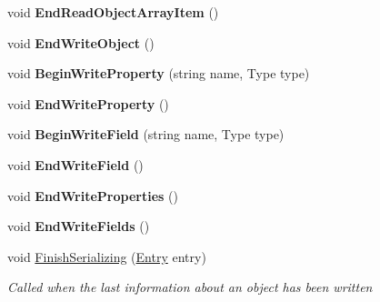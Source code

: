 \begin{DoxyCompactItemize}
void {\bfseries End\+Read\+Object\+Array\+Item} ()
\item 
\mbox{\label{class_serialization_1_1_binary_serializer_afa2c3e312cbe5f67a4b963cb0dadaa75}} 
void {\bfseries End\+Write\+Object} ()
\item 
\mbox{\label{class_serialization_1_1_binary_serializer_adbfae0ca57e2c848c4efa0ae23b25e62}} 
void {\bfseries Begin\+Write\+Property} (string name, Type type)
\item 
\mbox{\label{class_serialization_1_1_binary_serializer_a481fce2c7372e97a46ab15316c33a395}} 
void {\bfseries End\+Write\+Property} ()
\item 
\mbox{\label{class_serialization_1_1_binary_serializer_a33ed72f54b3502aa05c62bf777027fde}} 
void {\bfseries Begin\+Write\+Field} (string name, Type type)
\item 
\mbox{\label{class_serialization_1_1_binary_serializer_a3fa0ec1f937e4009887ea69b42461c04}} 
void {\bfseries End\+Write\+Field} ()
\item 
\mbox{\label{class_serialization_1_1_binary_serializer_af242d8344e351d53f4cb1dca1f0d321c}} 
void {\bfseries End\+Write\+Properties} ()
\item 
\mbox{\label{class_serialization_1_1_binary_serializer_a09fa1076cad8e42856d57a62d693c4cf}} 
void {\bfseries End\+Write\+Fields} ()
\item 
void \hyperlink{class_serialization_1_1_binary_serializer_a026959038d36c07fc77d6da1345ab4d2}{Finish\+Serializing} (\hyperlink{class_serialization_1_1_entry}{Entry} entry)
\begin{DoxyCompactList}\small\item\em Called when the last information about an object has been written \end{DoxyCompactList}\item 
\mbox{\label{class_serialization_1_1_binary_serializer_aa91a1c6b09260e35b8342d1254e15d3c}} 

\end{DoxyCompactItemize}
